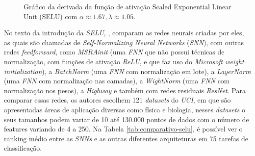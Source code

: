 \begin{figure}[h!]
    \centering
    \caption{Gráfico da derivada da função de ativação Scaled Exponential Linear Unit (SELU) com $\alpha \approx 1.67, \lambda \approx 1.05$.}
    \label{fig:selu-derivada}
\end{figure}

No texto da introdução da \textit{SELU}, \textcite{SELUArticle}, comparam as redes neurais criadas por eles, as quais são chamadas de \textit{Self-Normalizing Neural Networks} (\textit{SNN}), com outras redes \textit{feedforward}, como \textit{MSRAinit} (uma \textit{FNN} que não possui técnicas de normalização, com funções de ativação \textit{ReLU}, e que faz uso do \textit{Microsoft weight initialization}), a \textit{BatchNorm} (uma \textit{FNN} com normalização em lote), a \textit{LayerNorm} (uma \textit{FNN} com normalização nas camadas), a \textit{WightNorm} (uma \textit{FNN} com normalização nos pesos), a \textit{Highway} e também com redes residuais \textit{ResNet}. Para comparar essas redes, os autores escolhem 121 \textit{datasets} do \textit{UCI}, em que são apresentadas áreas de aplicação diversas como física e biologia, nesses \textit{datasets} o seus tamanhos podem variar de 10 até 130.000 pontos de dados com o número de features variando de 4 a 250. Na Tabela \ref{tab:comparativo-selu}, é possível ver o ranking médio entre as \textit{SNNs} e as outras diferentes arquiteturas em 75 tarefas de classificação.

